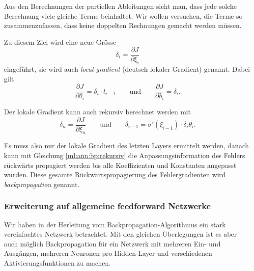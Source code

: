 Aus den Berechnungen der partiellen Ableitungen sieht man, dass jede solche
Berechnung viele gleiche Terme beinhaltet. Wir wollen versuchen, die Terme so
zusammenzufassen, dass keine doppelten Rechnungen gemacht werden müssen.

Zu diesem Ziel wird eine neue Grösse 
\begin{equation}
    \delta_i = \frac{\partial J}{\partial \xi_i}
\end{equation}
eingeführt, sie wird auch \emph{local gradient} (deutsch lokaler Gradient) genannt. Dabei
gilt
\begin{equation}
    \frac{\partial J}{\partial \theta_i} = \delta_i \cdot l_{i-1}
    \qquad\text{und}\qquad
    \frac{\partial J}{\partial b_i} = \delta_i.
\end{equation}

Der lokale Gradient kann auch rekursiv berechnet werden mit
\begin{equation}
    \delta_n = \frac{\partial J}{\partial \xi_n}
    \qquad\text{und}\qquad
    \delta_{i-1} = \sigma'(\xi_{i-1}) \cdot \delta_i \theta_i.
    \label{ml:ann:bp:rekursiv}
\end{equation}

Es muss also nur der lokale Gradient des letzten Layers ermittelt werden, danach kann mit
Gleichung \ref{ml:ann:bp:rekursiv} die Anpassungsinformation des Fehlers rückwärts
propagiert werden bis alle Koeffizienten und Konstanten angepasst wurden. Diese gesamte
Rückwärtspropagierung des Fehlergradienten wird \emph{backpropagation} genannt.

\subsubsection{Erweiterung auf allgemeine feedforward Netzwerke}

Wir haben in der Herleitung vom Backpropagation-Algorithmus ein stark vereinfachtes
Netzwerk betrachtet. Mit den gleichen Überlegungen ist es aber auch möglich
Backpropagation für ein Netzwerk mit mehreren Ein- und Ausgängen, mehreren Neuronen pro
Hidden-Layer und verschiedenen Aktivierungsfunktionen zu machen.

